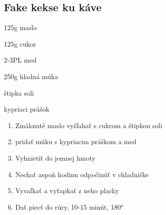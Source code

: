 \setcounter{step}{0}
\subsection{Fake kekse ku káve}

\begin{ingredient}
\def\portions{4}%

\begin{main}
	\item 125g maslo
	\item 125g cukor
	\item 2-3PL med
	\item 250g hladná múka
	\item štipka soli
	\item kypriaci prášok
\end{main}
\end{ingredient}
\begin{recipe}

\begin{enumerate}


\item{Zmäknuté maslo vyšľahať s cukrom a štipkou soli}
\item{pridať múku s kypriacim práškom a med}
\item{Vyhnietiť do jemnej hmoty}	
\item{Nechať aspoň hodinu odpočinúť v chladničke}
\item{Vyvaľkať a vyťapkať z neho placky}
\item{Dať piecť do rúry, 10-15 minút, 180°}

\end{enumerate}
\end{recipe}

\begin{notes}

\end{notes}
\clearpage	